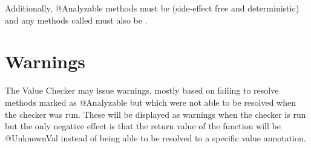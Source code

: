 Additionally, @Analyzable methods must
be  (side-effect free and
deterministic) and any methods called must also be .

\section{Warnings}
The Value Checker may issue warnings, mostly based on failing to
resolve methods marked as @Analyzable but which were not able to be
resolved when the checker was run. These will be displayed as warnings when
the checker is run but the only negative effect is that the return
value of the function will be @UnknownVal instead of being able to be
resolved to a specific value annotation.

